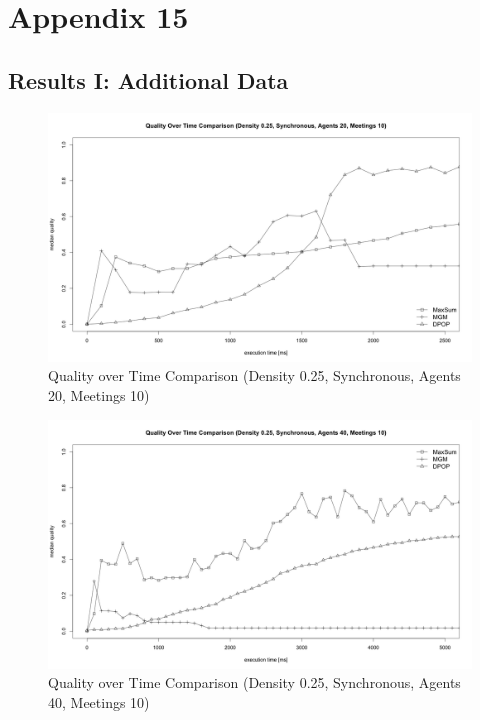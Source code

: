 \chapter{Appendix 15}
\label{a:appendix}

\section{Results I: Additional Data}

\begin{figure}[H]
\centering
\includegraphics[width=430px]{graphics/experiments/static/st_2}
\caption{Quality over Time Comparison (Density 0.25, Synchronous, Agents 20, Meetings 10)}
\label{fig:st_2}
\end{figure}

\begin{figure}[H]
\centering
\includegraphics[width=430px]{graphics/experiments/static/st_4}
\caption{Quality over Time Comparison (Density 0.25, Synchronous, Agents 40, Meetings 10)}
\label{fig:st_3}
\end{figure}